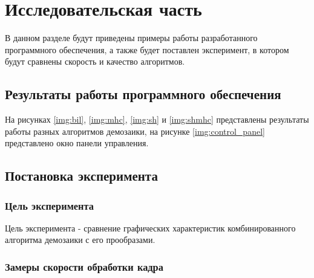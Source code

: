 \chapter{Исследовательская часть}

В данном разделе будут приведены примеры работы разработанного программного обеспечения, а также будет поставлен эксперимент, в котором будут сравнены скорость и качество алгоритмов.

\section{Результаты работы программного обеспечения}

На рисунках \ref{img:bil}, \ref{img:mhc}, \ref{img:sh} и \ref{img:shmhc} представлены результаты работы разных алгоритмов демозаики, на рисунке \ref{img:control_panel} представлено окно панели управления.


\clearpage

\section{Постановка эксперимента}

\subsection{Цель эксперимента}

Цель эксперимента - сравнение графических характеристик комбинированного алгоритма демозаики с его прообразами.

\subsection{Замеры скорости обработки кадра}

\begin{table}[h]
	\begin{center}
		\caption{Скорость обработки кадра (в тиках).}
		\label{tbl:small}
	\end{center}
\end{table}


